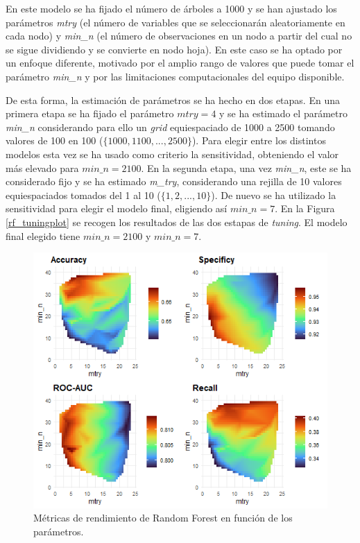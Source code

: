 \documentclass[12pt,a4paper,]{book}
\numberwithin{dummy}{section}
\theoremstyle{ocrenumbox}
\theoremstyle{blacknumex}
\theoremstyle{blacknumbox}
\theoremstyle{ocrenum}
\theoremstyle{ocrenum}
\begin{document}
En este modelo se ha fijado el número de árboles a 1000 y se han
ajustado los parámetros \emph{mtry} (el número de variables que se
seleccionarán aleatoriamente en cada nodo) y \emph{min\_n} (el número de
observaciones en un nodo a partir del cual no se sigue dividiendo y se
convierte en nodo hoja). En este caso se ha optado por un enfoque
diferente, motivado por el amplio rango de valores que puede tomar el
parámetro \emph{min\_n} y por las limitaciones computacionales del
equipo disponible.

De esta forma, la estimación de parámetros se ha hecho en dos etapas. En
una primera etapa se ha fijado el parámetro \(mtry = 4\) y se ha
estimado el parámetro \emph{min\_n} considerando para ello un
\emph{grid} equiespaciado de 1000 a 2500 tomando valores de 100 en 100
(\(\{1000,1100,...,2500\}\)). Para elegir entre los distintos modelos
esta vez se ha usado como criterio la sensitividad, obteniendo el valor
más elevado para \(min\_n = 2100\). En la segunda etapa, una vez
\emph{min\_n}, este se ha considerado fijo y se ha estimado
\emph{m\_try}, considerando una rejilla de 10 valores equiespaciados
tomados del 1 al 10 (\(\{1,2,...,10\}\)). De nuevo se ha utilizado la
sensitividad para elegir el modelo final, eligiendo así \(min\_n = 7\).
En la Figura \ref{rf_tuningplot} se recogen los resultados de las dos
estapas de \emph{tuning}. El modelo final elegido tiene
\(min\_n = 2100\) y \(min\_n = 7\).

\begin{figure}[h]
\centering
\includegraphics[width =\textwidth]{graficos/rf_tuningplot.png}
\caption{Métricas de rendimiento de Random Forest en función de los parámetros.}
\label{fig:rf_tuningplot}
\end{figure}
\end{document}
